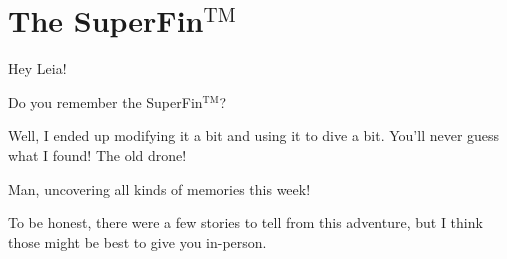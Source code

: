 \chapter{The SuperFin$^\mathrm{TM}$}

\noindent Hey Leia!

Do you remember the SuperFin$^\mathrm{TM}$?

Well, I ended up modifying it a bit and using it to dive a bit. You'll never guess what I found! The old drone!

Man, uncovering all kinds of memories this week!

To be honest, there were a few stories to tell from this adventure, but I think those might be best to give you in-person.
